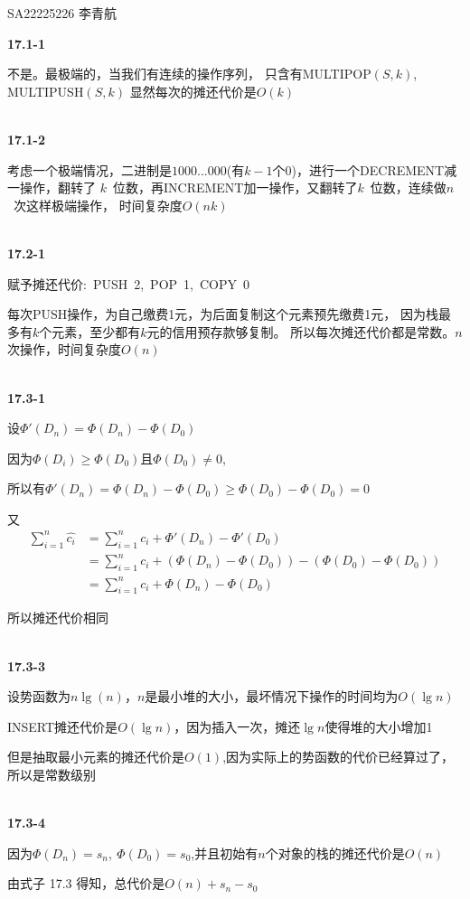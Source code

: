 \documentclass[UTF8]{ctexart}
\begin{document}
    
SA22225226 李青航

\noindent\textbf{17.1-1}

不是。最极端的，当我们有连续的操作序列，
只含有MULTIPOP$(S,k)$,\\MULTIPUSH$(S,k)$
显然每次的摊还代价是$O(k)$

~\\
\noindent\textbf{17.1-2}

考虑一个极端情况，二进制是$1000...000$(有$k-1$个0)，进行一个DECREMENT减一操作，翻转了
$k$~位数，再INCREMENT加一操作，又翻转了$k$~位数，连续做$n$~次这样极端操作，
时间复杂度$O(nk)$

~\\
\noindent\textbf{17.2-1}

赋予摊还代价:~PUSH~2,~POP~1,~COPY~0

每次PUSH操作，为自己缴费1元，为后面复制这个元素预先缴费1元，
因为栈最多有$k$个元素，至少都有$k$元的信用预存款够复制。
所以每次摊还代价都是常数。$n$次操作，时间复杂度$O(n)$

~\\
\noindent\textbf{17.3-1}


设$\Phi '(D_n)=\Phi (D_n)-\Phi (D_0)$

因为$\Phi (D_i)\ge \Phi (D_0)$且$\Phi (D_0) \ne 0$,

所以有$\Phi '(D_n)=\Phi (D_n)-\Phi (D_0)\ge \Phi (D_0)-\Phi (D_0)=0$

又
\begin{equation*}
    \begin{aligned}
        \sum_{i=1}^{n}\hat{c_i} 
        &=\sum_{i=1}^{n}c_i+\Phi '(D_n)-\Phi ' (D_0)\\
        &=\sum_{i=1}^{n}c_i+(\Phi (D_n)-\Phi  (D_0))-(\Phi (D_0)-\Phi  (D_0))\\
        &=\sum_{i=1}^{n}c_i+\Phi (D_n)-\Phi  (D_0)
    \end{aligned}
\end{equation*}

所以摊还代价相同

~\\
\noindent\textbf{17.3-3}

设势函数为$n\lg (n)$，$n$是最小堆的大小，最坏情况下操作的时间均为$O(\lg n)$

INSERT摊还代价是$O(\lg n)$，因为插入一次，摊还$\lg n$使得堆的大小增加1

但是抽取最小元素的摊还代价是$O(1)$,因为实际上的势函数的代价已经算过了，所以是常数级别



~\\
\noindent\textbf{17.3-4}

因为$\Phi (D_n)=s_n,~\Phi (D_0)=s _0$,并且初始有$n$个对象的栈的摊还代价是$O(n)$

由式子 17.3 得知，总代价是$O(n) + s_n - s_0$
\end{document}
